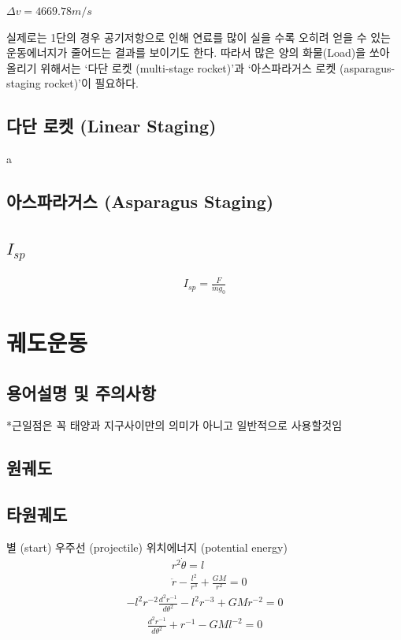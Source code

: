 \documentclass[9pt]{amsbook}
\begin{document}
$\Delta v = 4669.78 m/s$

실제로는 1단의 경우 공기저항으로 인해 연료를 많이 실을 수록 오히려 얻을 수 있는 운동에너지가 줄어드는 결과를 보이기도 한다. 따라서 많은 양의 화물(Load)을 쏘아 올리기 위해서는 `다단 로켓 (multi-stage rocket)'과 `아스파라거스 로켓 (asparagus-staging rocket)'이 필요하다.


\section{다단 로켓 (Linear Staging)}
a


\section{아스파라거스 (Asparagus Staging)}

\section{$I_{sp}$}
\begin{align}
I_{sp} = \frac{F}{\dot{m}g_0}
\end{align}


\chapter{궤도운동}
\section{용어설명 및 주의사항}
*근일점은 꼭 태양과 지구사이만의 의미가 아니고 일반적으로 사용할것임
\section{원궤도}
\section{타원궤도}
별 (start) 우주선 (projectile) 위치에너지 (potential energy)
\begin{align}
&r^2 \dot{\theta} = l
\\&\ddot{r}-\frac{l^2}{r^3}+\frac{GM}{r^2} = 0
\end{align}
\begin{align}
	-l^2r^{-2}\frac{d^2r^{-1}}{d\theta^2}-l^2r^{-3}+GMr^{-2} = 0
\end{align}
\begin{align}
	\frac{d^2r^{-1}}{d\theta^2}+r^{-1}-GMl^{-2} = 0
\end{align}
\end{document}

